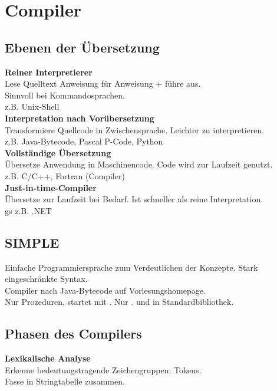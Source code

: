 

\section{Compiler}

\subsection{Ebenen der Übersetzung}
\textbf{Reiner Interpretierer}\\
Lese Quelltext Anweisung für Anweisung + führe aus.\\
Sinnvoll bei Kommandosprachen.\\
z.B. Unix-Shell\\

\textbf{Interpretation nach Vorübersetzung}\\
Transformiere Quellcode in Zwischensprache. Leichter zu interpretieren.\\
z.B. Java-Bytecode, Pascal P-Code, Python\\

\textbf{Vollständige Übersetzung}\\
Übersetze Anwendung in Maschinencode. Code wird zur Laufzeit genutzt.\\
z.B. C/C++, Fortran (Compiler)\\

\textbf{Just-in-time-Compiler}\\
Übersetze zur Laufzeit bei Bedarf. Ist schneller als reine Interpretation.\\ gs
z.B. .NET

\subsection{SIMPLE}
Einfache Programmiersprache zum Verdeutlichen der Konzepte.
Stark eingeschränkte Syntax.\\
Compiler nach Java-Bytecode auf Vorlesungshomepage.\\

Nur Prozeduren, startet mit . Nur .
 und  in Standardbibliothek.

\subsection{Phasen des Compilers}
\textbf{Lexikalische Analyse}\\
Erkenne bedeutungstragende Zeichengruppen: Tokens.\\
Fasse in Stringtabelle zusammen.\\

